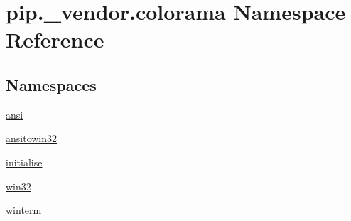 \hypertarget{namespacepip_1_1__vendor_1_1colorama}{}\section{pip.\+\_\+vendor.\+colorama Namespace Reference}
\label{namespacepip_1_1__vendor_1_1colorama}
\subsection*{Namespaces}
\begin{DoxyCompactItemize}
\item 
 \hyperlink{namespacepip_1_1__vendor_1_1colorama_1_1ansi}{ansi}
\item 
 \hyperlink{namespacepip_1_1__vendor_1_1colorama_1_1ansitowin32}{ansitowin32}
\item 
 \hyperlink{namespacepip_1_1__vendor_1_1colorama_1_1initialise}{initialise}
\item 
 \hyperlink{namespacepip_1_1__vendor_1_1colorama_1_1win32}{win32}
\item 
 \hyperlink{namespacepip_1_1__vendor_1_1colorama_1_1winterm}{winterm}
\end{DoxyCompactItemize}
